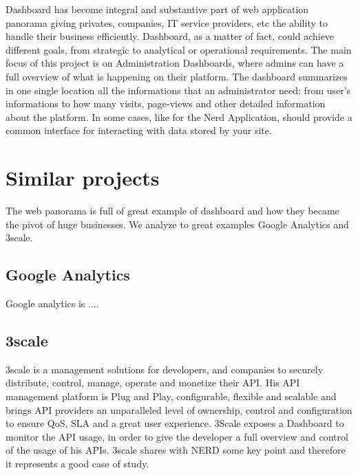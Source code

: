 \documentclass[a4paper,12pt]{report}
\begin{document}
Dashboard has become integral and substantive part of web application panorama giving privates, companies, IT service providers, etc the ability to handle their business efficiently. Dashboard, as a matter of fact, could achieve different goals, from strategic to analytical or operational requirements.
The main focus of this project is on Administration Dashboards, where admins can have a full overview of what is happening on their platform. The dashboard summarizes in one single location all the informations that an administrator need: from user's informations to how many visits, page-views and other detailed information about the platform. In some cases, like for the Nerd Application, should provide a common interface for interacting with data stored by your site.

\chapter{Similar projects}

The web panorama is full of great example of dashboard and how they became the pivot of huge businesses.
We analyze to great examples Google Analytics and 3scale.
\section{Google Analytics}
Google analytics is ....
\section{3scale}
3scale is a management solutions for developers, and companies to securely distribute, control, manage, operate and monetize their API. His API management platform is Plug and Play, configurable, flexible and scalable and brings API providers an unparalleled level of ownership, control and configuration to ensure QoS, SLA and a great user experience.
3Scale exposes a Dashboard to monitor the API usage, in order to give the developer a full overview and control of the usage of his APIs.
3scale shares with NERD some key point and therefore it  represents a good case of study.
\end{document}
